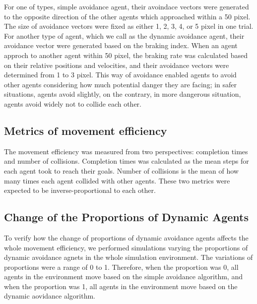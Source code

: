 \documentclass[letterpaper, 10 pt, conference]{ieeeconf}  %
\begin{document}
For one of types, simple avoidance agent, their avoindace vectors were generated to the opposite direction of the other agents which approached within a 50 pixel. The size of avoidance vectors were fixed as either 1, 2, 3, 4, or 5 pixel in one trial. 
For another type of agent, which we call as the dynamic avoidance agent, their avoidance vector were generated based on the braking index. When an agent approch to another agent within 50 pixel, the braking rate was calculated based on their relative positions and velocities, and their avoidance vectors were determined from 1 to 3 pixel. This way of avoidance enabled agents to avoid other agents considering how much potential danger they are facing; in safer situations, agents avoid slightly, on the contrary, in more dangerous situation, agents avoid widely not to collide each other. 

\subsection{Metrics of movement efficiency}
The movement efficiency was measured from two perspectives: completion times and number of collisions. Completion times was calculated as the mean steps for each agent took to reach their goals. Number of collisions is the mean of how many times each agent collided with other agents. These two metrics were expected to be inverse-proportional to each other.

\subsection{Change of the Proportions of Dynamic Agents}
To verify how the change of proportions of dynamic avoidance agents affects the whole movement efficiency, we performed simulations varying the proportions of dynamic avoidance agnets in the whole simulation environment. The variations of proportions were a range of 0 to 1. Therefore, when the proportion was 0, all agents in the environment move based on the simple avoidance algorithm, and when the proportion was 1, all agents in the environment move based on the dynamic aovidance algorithm. 
\end{document}
